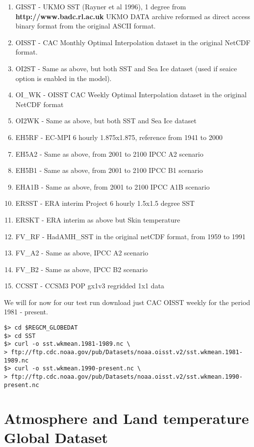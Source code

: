 \begin{enumerate}
\item GISST - UKMO SST (Rayner et al 1996), 1 degree from
{\bf http://www.badc.rl.ac.uk} UKMO DATA archive reformed as direct access
binary format from the original ASCII format.
\item OISST - CAC Monthly Optimal Interpolation dataset in the original 
NetCDF format.
\item OI2ST - Same as above, but both SST and Sea Ice dataset (used if seaice
option is enabled in the model).
\item OI\_WK - OISST CAC Weekly Optimal Interpolation dataset in the original
NetCDF format
\item OI2WK - Same as above, but both SST and Sea Ice dataset
\item EH5RF - EC-MPI 6 hourly 1.875x1.875, reference from 1941 to 2000
\item EH5A2 - Same as above, from 2001 to 2100 IPCC A2 scenario
\item EH5B1 - Same as above, from 2001 to 2100 IPCC B1 scenario
\item EHA1B - Same as above, from 2001 to 2100 IPCC A1B scenario
\item ERSST - ERA interim Project 6 hourly 1.5x1.5 degree SST
\item ERSKT - ERA interim as above but Skin temperature
\item FV\_RF - HadAMH\_SST in the original netCDF format, from 1959 to 1991
\item FV\_A2 - Same as above, IPCC A2 scenario
\item FV\_B2 - Same as above, IPCC B2 scenario 
\item CCSST - CCSM3 POP gx1v3 regridded 1x1 data
\end{enumerate}

We will for now for our test run download just CAC OISST weekly for the
period 1981 - present.

\begin{Verbatim}
$> cd $REGCM_GLOBEDAT
$> cd SST
$> curl -o sst.wkmean.1981-1989.nc \
> ftp://ftp.cdc.noaa.gov/pub/Datasets/noaa.oisst.v2/sst.wkmean.1981-1989.nc
$> curl -o sst.wkmean.1990-present.nc \
> ftp://ftp.cdc.noaa.gov/pub/Datasets/noaa.oisst.v2/sst.wkmean.1990-present.nc
\end{Verbatim}

\section{Atmosphere and Land temperature Global Dataset}
